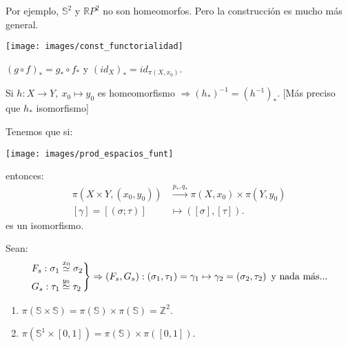 Por ejemplo, $\mathbb{S}^2$ y $\mathbb{R}P^2$ no son homeomorfos. Pero la construcción es mucho más general.
\begin{center}
    \texttt{[image: images/const\_functorialidad]} 
\end{center}

\begin{defi}[Funtorialidad]
$\left( g \circ f \right)_* = g_* \circ f_*$ y $\left( id_X \right)_* = id_{\pi\left( X, x_0 \right)}$. 
\end{defi}

\begin{ej}
    Si $h: X \rightarrow Y,\ x_0 \mapsto y_0$ es homeomorfismo $\Rightarrow \left( h_* \right)^{-1} = \left( h^{-1} \right)_*$. [Más preciso que $h_*$ isomorfismo]
\end{ej}

\begin{prop}
Tenemos que si:
\begin{center}
    \texttt{[image: images/prod\_espacios\_funt]} 
\end{center} 
entonces:
\begin{align*}
    \pi\left( X \times Y, \left( x_0, y_0 \right) \right) &\xrightarrow{p_*, q_*} \pi\left( X, x_0 \right) \times \pi \left( Y, y_0 \right)\\
    \left[ \gamma \right] = \left[ \left( \sigma; \tau \right) \right] &\mapsto \left( \left[ \sigma \right], \left[ \tau \right] \right)
.\end{align*}
es un isomorfismo.
\end{prop}
\begin{demo}
Sean:
\[
\begin{rcases}
    F_s: \sigma_1 \stackrel{x_0}{\simeq} \sigma_2\\
    G_s: \tau_1 \stackrel{y_0}{\simeq} \tau_2
\end{rcases} \Rightarrow \left( F_s, G_s \right): \left( \sigma_1, \tau_1 \right) = \gamma_1 \mapsto \gamma_2 = \left( \sigma_2, \tau_2 \right) \text{ y nada más...} 
\]
\end{demo}

\begin{ej}
\begin{enumerate}
    \item $\pi\left( \mathbb{S} \times \mathbb{S} \right) = \pi\left( \mathbb{S} \right) \times \pi\left( \mathbb{S} \right) = \mathbb{Z}^2$.
    \item $\pi\left( \mathbb{S}^1 \times \left[ 0, 1 \right] \right) = \pi\left( \mathbb{S} \right) \times \pi\left( \left[ 0, 1 \right] \right)$.
\end{enumerate}
\end{ej}
